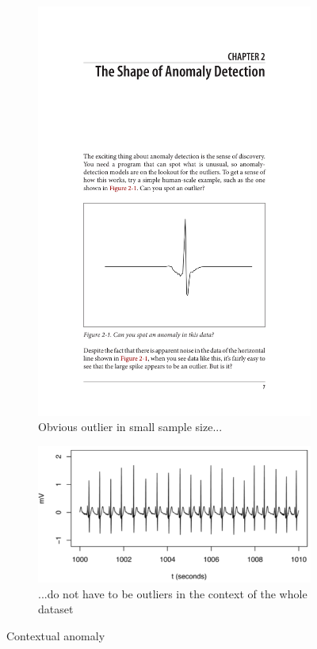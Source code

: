 \documentclass{vldb}
\begin{document}
\begin{figure}
\begin{subfigure}{.5 \textwidth}
	\centering
	\includegraphics[width=\linewidth]{"pics/ekg"}
	\caption{Obvious outlier in small sample size...}
	\label{subfig:context-a}
\end{subfigure}
\begin{subfigure}{.5\textwidth}
  \centering
  \includegraphics[width=.9\linewidth]{"pics/ekg2"}
  \caption{...do not have to be outliers in the context of the whole dataset}
  \label{subfig:context-b}
\end{subfigure}
\caption{Contextual anomaly}
\label{fig:contextual-anomaly}
\end{figure}
\end{document}
